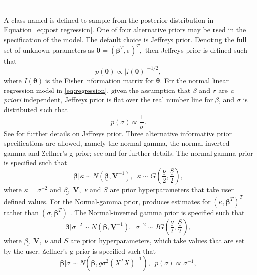 -\documentclass[article]{jss}
\begin{document}
A class named  is defined to sample from the
posterior distribution in Equation~\ref{eq:post regression}. One of
four alternative priors may be used in the specification of the model.
The default choice is Jeffreys prior. Denoting the full set of unknown
parameters as $\bm{\theta}=(\bm{\beta}^{T},\sigma)^{T},$ then Jeffreys
prior is defined such that
\begin{equation}
  p(\bm{\theta})\propto|I(\bm{\theta})|^{-1/2},\label{eq:Jeffrey's
    Prior}
\end{equation} 
where $I(\bm{\theta})$ is the Fisher information matrix for
$\bm{\theta}.$ For the normal linear regression model in
\ref{eq:regression}, given the assumption that $\beta$ and $\sigma$
are \emph{a priori} independent, Jeffreys prior is flat over the
real number line for $\beta$, and $\sigma$ is distributed such
that
\begin{equation}
		p\left(\sigma\right)\propto\frac{1}{\sigma}.
\end{equation}
See \cite{Zellner1971} for further details on Jeffreys prior. Three
alternative informative prior specifications are allowed, namely the
normal-gamma, the normal-inverted-gamma and Zellner's g-prior; see
\cite{Zellner1971} and \cite{MarinRobert2007} for further details.
The normal-gamma prior is specified such that
\begin{equation}
  \bm{\beta}|\kappa\sim
  N(\bm{\underline{\beta}},\underline{\bm{V}}^{-1}),\,\,\,\kappa\sim
  G\left(\frac{\underline{\nu}}{2},\frac{\underline{S}}{2}\right),\label{eq:Normal
    Gamma}
\end{equation} 
where $\kappa=\sigma^{-2}$ and $\underline{\beta,}$
$\underline{\bm{V}},$ $\underline{\nu}$ and $\underline{S}$ are prior
hyperparameters that take user defined values. For the Normal-gamma
prior,  produces estimates for\emph{
  $\left(\kappa,\bm{\beta}^{T}\right)^{T}$ }rather than
$\left(\sigma,\bm{\beta}^{T}\right)$ . The Normal-inverted gamma prior
is specified such that
\begin{equation}
  \bm{\beta}|\sigma^{-2}\sim
  N(\bm{\underline{\beta}},\underline{\bm{V}}^{-1}),\,\,\,\sigma^{-2}\sim
  IG\left(\frac{\underline{\nu}}{2},\frac{\underline{S}}{2}\right),\label{eq:Normal
    Inverted Gamma}
\end{equation} 
where $\underline{\beta,}$ $\underline{\bm{V}},$ $\underline{\nu}$ and
$\underline{S}$ are prior hyperparameters, which take values that are
set by the user. Zellner's g-prior is specified such that
\begin{equation} \bm{\beta}|\sigma\sim
  N\left(\underline{\bm{\beta}},g\sigma^{2}\left(X^{T}X\right)^{-1}\right),\,\,\,
  p(\sigma)\propto\sigma^{-1},\label{eq:g-prior}
\end{equation}
\end{document}
